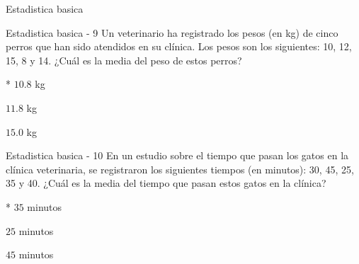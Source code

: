 \documentclass[a4,11pt]{aleph-notas}
\begin{document}
\begin{quiz}{Estadistica basica}
\begin{multi}%
    {Estadistica basica - 9}
    Un veterinario ha registrado los pesos (en kg) de cinco perros que han sido atendidos en su clínica. Los pesos son los siguientes: 10, 12, 15, 8 y 14. ¿Cuál es la media del peso de estos perros?
    \item[]* $10.8$ kg
    \item[] $11.8$ kg
    \item[] $15.0$ kg
\end{multi}

\begin{multi}%
    {Estadistica basica - 10}
    En un estudio sobre el tiempo que pasan los gatos en la clínica veterinaria, se registraron los siguientes tiempos (en minutos): 30, 45, 25, 35 y 40. ¿Cuál es la media del tiempo que pasan estos gatos en la clínica?
    \item[]* $35$ minutos
    \item[] $25$ minutos
    \item[] $45$ minutos
\end{multi}

\end{quiz}
\end{document}
